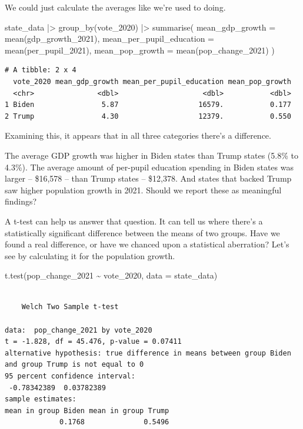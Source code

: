\documentclass[
  letterpaper,
  DIV=11,
  numbers=noendperiod]{scrreprt}
\newenvironment{Shaded}{\begin{snugshade}}{\end{snugshade}}
\newcommand{\AttributeTok}[1]{\textcolor[rgb]{0.40,0.45,0.13}{#1}}
\newcommand{\FunctionTok}[1]{\textcolor[rgb]{0.28,0.35,0.67}{#1}}
\newcommand{\NormalTok}[1]{\textcolor[rgb]{0.00,0.23,0.31}{#1}}
\newcommand{\SpecialCharTok}[1]{\textcolor[rgb]{0.37,0.37,0.37}{#1}}
\begin{document}
We could just calculate the averages like we're used to doing.

\begin{Shaded}
\begin{Highlighting}[]
\NormalTok{state\_data }\SpecialCharTok{|\textgreater{}}
  \FunctionTok{group\_by}\NormalTok{(vote\_2020) }\SpecialCharTok{|\textgreater{}}
  \FunctionTok{summarise}\NormalTok{(}
    \AttributeTok{mean\_gdp\_growth =} \FunctionTok{mean}\NormalTok{(gdp\_growth\_2021),}
    \AttributeTok{mean\_per\_pupil\_education =} \FunctionTok{mean}\NormalTok{(per\_pupil\_2021),}
    \AttributeTok{mean\_pop\_growth =} \FunctionTok{mean}\NormalTok{(pop\_change\_2021)}
\NormalTok{  )}
\end{Highlighting}
\end{Shaded}

\begin{verbatim}
# A tibble: 2 x 4
  vote_2020 mean_gdp_growth mean_per_pupil_education mean_pop_growth
  <chr>               <dbl>                    <dbl>           <dbl>
1 Biden                5.87                   16579.           0.177
2 Trump                4.30                   12379.           0.550
\end{verbatim}

Examining this, it appears that in all three categories there's a
difference.

The average GDP growth was higher in Biden states than Trump states
(5.8\% to 4.3\%). The average amount of per-pupil education spending in
Biden states was larger -- \$16,578 -- than Trump states -- \$12,378.
And states that backed Trump saw higher population growth in 2021.
Should we report these as meaningful findings?

A t-test can help us answer that question. It can tell us where there's
a statistically significant difference between the means of two groups.
Have we found a real difference, or have we chanced upon a statistical
aberration? Let's see by calculating it for the population growth.

\begin{Shaded}
\begin{Highlighting}[]
\FunctionTok{t.test}\NormalTok{(pop\_change\_2021 }\SpecialCharTok{\textasciitilde{}}\NormalTok{ vote\_2020, }\AttributeTok{data =}\NormalTok{ state\_data)}
\end{Highlighting}
\end{Shaded}

\begin{verbatim}

    Welch Two Sample t-test

data:  pop_change_2021 by vote_2020
t = -1.828, df = 45.476, p-value = 0.07411
alternative hypothesis: true difference in means between group Biden and group Trump is not equal to 0
95 percent confidence interval:
 -0.78342389  0.03782389
sample estimates:
mean in group Biden mean in group Trump 
             0.1768              0.5496 
\end{verbatim}
\end{document}
